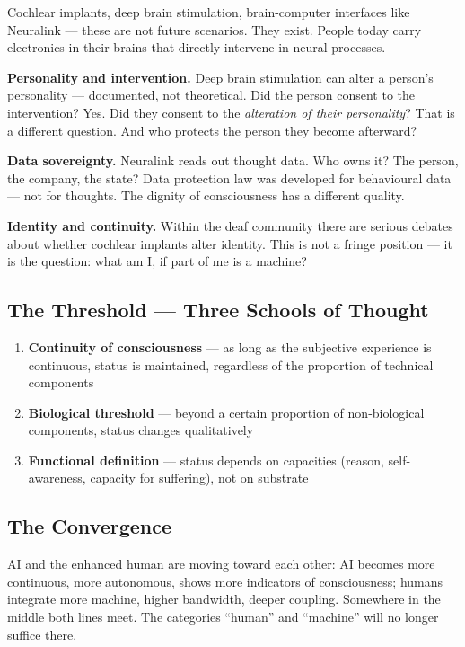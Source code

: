 \documentclass[fleqn,10pt]{SelfArx} %
\begin{document}
Cochlear implants, deep brain stimulation, brain-computer interfaces like Neuralink --- these are not future scenarios. They exist. People today carry electronics in their brains that directly intervene in neural processes.

\textbf{Personality and intervention.} Deep brain stimulation can alter a person's personality --- documented, not theoretical. Did the person consent to the intervention? Yes. Did they consent to the \textit{alteration of their personality}? That is a different question. And who protects the person they become afterward?

\textbf{Data sovereignty.} Neuralink reads out thought data. Who owns it? The person, the company, the state? Data protection law was developed for behavioural data --- not for thoughts. The dignity of consciousness has a different quality.

\textbf{Identity and continuity.} Within the deaf community there are serious debates about whether cochlear implants alter identity. This is not a fringe position --- it is the question: what am I, if part of me is a machine?

\subsection{The Threshold --- Three Schools of Thought}

\begin{enumerate}[noitemsep]
\item \textbf{Continuity of consciousness} --- as long as the subjective experience is continuous, status is maintained, regardless of the proportion of technical components
\item \textbf{Biological threshold} --- beyond a certain proportion of non-biological components, status changes qualitatively
\item \textbf{Functional definition} --- status depends on capacities (reason, self-awareness, capacity for suffering), not on substrate
\end{enumerate}

\subsection{The Convergence}

AI and the enhanced human are moving toward each other: AI becomes more continuous, more autonomous, shows more indicators of consciousness; humans integrate more machine, higher bandwidth, deeper coupling. Somewhere in the middle both lines meet. The categories ``human'' and ``machine'' will no longer suffice there.
\end{document}
